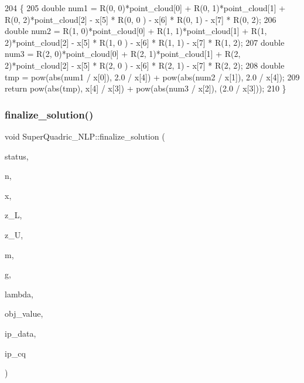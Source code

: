 \begin{DoxyCode}
204  \{
205      \textcolor{keywordtype}{double} num1 = R(0, 0)*point\_cloud[0] + R(0, 1)*point\_cloud[1] + R(0, 2)*point\_cloud[2] - x[5] * R(0, 0
      ) - x[6] * R(0, 1) - x[7] * R(0, 2);
206      \textcolor{keywordtype}{double} num2 = R(1, 0)*point\_cloud[0] + R(1, 1)*point\_cloud[1] + R(1, 2)*point\_cloud[2] - x[5] * R(1, 0
      ) - x[6] * R(1, 1) - x[7] * R(1, 2);
207      \textcolor{keywordtype}{double} num3 = R(2, 0)*point\_cloud[0] + R(2, 1)*point\_cloud[1] + R(2, 2)*point\_cloud[2] - x[5] * R(2, 0
      ) - x[6] * R(2, 1) - x[7] * R(2, 2);
208      \textcolor{keywordtype}{double} tmp = pow(abs(num1 / x[0]), 2.0 / x[4]) + pow(abs(num2 / x[1]), 2.0 / x[4]);
209      \textcolor{keywordflow}{return} pow(abs(tmp), x[4] / x[3]) + pow(abs(num3 / x[2]), (2.0 / x[3]));
210  \}
\end{DoxyCode}
\mbox{\label{classSuperQuadric__NLP_a2f0b1fc45d42b0ee77c343ea7c227874}} 
\subsubsection{\texorpdfstring{finalize\+\_\+solution()}{finalize\_solution()}}
{\footnotesize\ttfamily void Super\+Quadric\+\_\+\+N\+L\+P\+::finalize\+\_\+solution (\begin{DoxyParamCaption}\item[{Ipopt\+::\+Solver\+Return}]{status,  }\item[{Ipopt\+::\+Index}]{n,  }\item[{const Ipopt\+::\+Number $\ast$}]{x,  }\item[{const Ipopt\+::\+Number $\ast$}]{z\+\_\+L,  }\item[{const Ipopt\+::\+Number $\ast$}]{z\+\_\+U,  }\item[{Ipopt\+::\+Index}]{m,  }\item[{const Ipopt\+::\+Number $\ast$}]{g,  }\item[{const Ipopt\+::\+Number $\ast$}]{lambda,  }\item[{Ipopt\+::\+Number}]{obj\+\_\+value,  }\item[{const Ipopt\+::\+Ipopt\+Data $\ast$}]{ip\+\_\+data,  }\item[{Ipopt\+::\+Ipopt\+Calculated\+Quantities $\ast$}]{ip\+\_\+cq }\end{DoxyParamCaption})\hspace{0.3cm}{\ttfamily [protected]}}



